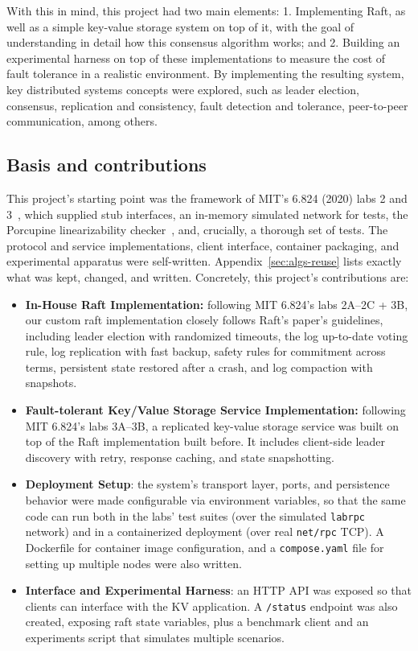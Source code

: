 \documentclass[conference]{IEEEtran}
\begin{document}
With this in mind, this project had two main elements: 1. Implementing Raft, as well as a simple key-value storage system on top of it, with the goal of understanding in detail how this consensus algorithm works; and 2. Building an experimental harness on top of these implementations to measure the cost of fault tolerance in a realistic environment. By implementing the resulting system, key distributed systems concepts were explored, such as leader election, consensus, replication and consistency, fault detection and tolerance, peer-to-peer communication, among others.

\subsection*{Basis and contributions}
This project's starting point was the framework of MIT's 6.824 (2020) labs 2 and 3~\cite{mit6824}, which supplied stub interfaces, an in-memory simulated network for tests, the Porcupine linearizability checker~\cite{porcupine}, and, crucially, a thorough set of tests. The protocol and service implementations, client interface, container packaging, and experimental apparatus were self-written. Appendix~\ref{sec:algs-reuse} lists exactly what was kept, changed, and written. Concretely, this project's contributions are:

\begin{itemize}
\item \textbf{In-House Raft Implementation:} following MIT 6.824's labs 2A--2C + 3B, our custom raft implementation closely follows Raft's  paper's guidelines, including leader election with randomized timeouts, the log up-to-date voting rule, log replication with fast backup, safety rules for commitment across terms, persistent state restored after a crash, and log compaction with snapshots.
\item \textbf{Fault-tolerant Key/Value Storage Service Implementation:} following MIT 6.824's labs 3A--3B, a replicated key-value storage service was built on top of the Raft implementation built before. It includes client-side leader discovery with retry, response caching, and state snapshotting.
\item \textbf{Deployment Setup}: the system's transport layer, ports, and persistence behavior were made configurable via environment variables, so that the same code can run both in the labs' test suites (over the simulated \texttt{labrpc} network) and in a containerized deployment (over real \texttt{net/rpc} TCP). A Dockerfile for container image configuration, and a \texttt{compose.yaml} file for setting up multiple nodes were also written.
\item \textbf{Interface and Experimental Harness}: an HTTP API was exposed so that clients can interface with the KV application. A \texttt{/status} endpoint was also created, exposing raft state variables, plus a benchmark client and an experiments script that simulates multiple scenarios.
\end{itemize}
\end{document}

